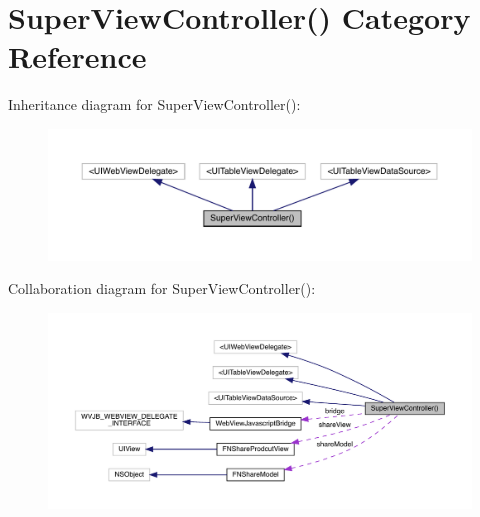 \hypertarget{category_super_view_controller_07_08}{}\section{Super\+View\+Controller() Category Reference}
\label{category_super_view_controller_07_08}


Inheritance diagram for Super\+View\+Controller()\+:\nopagebreak
\begin{figure}[H]
\begin{center}
\leavevmode
\includegraphics[width=350pt]{category_super_view_controller_07_08__inherit__graph}
\end{center}
\end{figure}


Collaboration diagram for Super\+View\+Controller()\+:\nopagebreak
\begin{figure}[H]
\begin{center}
\leavevmode
\includegraphics[width=350pt]{category_super_view_controller_07_08__coll__graph}
\end{center}
\end{figure}
